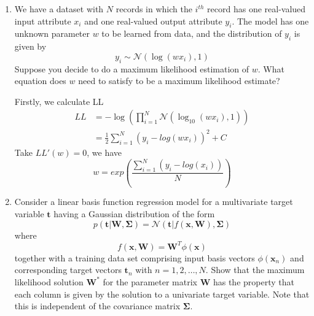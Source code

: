 \begin{enumerate}
\begin{enumerate}
    
\end{enumerate}
\item We have a dataset with $N$ records in which the $i^{th}$ record has one real-valued input attribute $x_i$ and one real-valued output attribute $y_i$. The model has one unknown parameter $w$ to be learned from data, and the distribution of $y_i$ is given by 
 $$y_i \sim \mathcal{N}(\log (wx_i),1)$$
 Suppose you decide to do a maximum likelihood estimation of $w$. What equation does $w$ need to satisfy to be a maximum likelihood estimate?
 
 Firstly, we calculate LL
\begin{align*}
    LL 	&= - \log(\prod_{i=1}^{N} \mathcal{N}(\log_{10}(wx_i),1)) \\
    	&= \frac{1}{2}\sum_{i=1}^{N}(y_i-log(wx_i))^2+C
\end{align*}
Take $LL'(w)=0$, we have
$$ w = exp\left(\frac{\sum_{i=1}^{N} (y_i-log(x_i))}{N}\right) $$

\item Consider a linear basis function regression model for a multivariate target variable $\mathbf{t}$ having a Gaussian distribution of the form 
 $$p(\mathbf{t}|\mathbf{W},\mathbf{\Sigma}) = \mathcal{N}(\mathbf{t}|f(\mathbf{x},\mathbf{W}),\mathbf{\Sigma})$$
 where 
 $$f(\mathbf{x,W}) = \mathbf{W}^T \phi(\mathbf{x})$$
 together with a training data set comprising input basis vectors $\phi (\mathbf{x}_n)$ and corresponding target vectors $\mathbf{t}_n$ with $n=1,2, \dots , N$. Show that the maximum likelihood solution $\mathbf{W}^{*}$ for the parameter matrix $\mathbf{W}$ has the property that each column is given by the solution to a univariate target variable. Note that this is independent of the covariance matrix $\mathbf{\Sigma}$. 
 

\end{enumerate}

